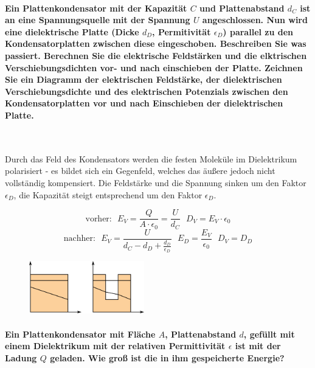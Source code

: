 \documentclass[a4paper, 11pt, parskip=half]{scrartcl}
\begin{document}
\paragraph{Ein Plattenkondensator mit der Kapazität $C$ und Plattenabstand $d_C$ ist an eine
Spannungsquelle mit der Spannung $U$ angeschlossen. Nun wird eine dielektrische Platte (Dicke $d_D$,
Permitivität $\epsilon_D$) parallel zu den Kondensatorplatten zwischen diese eingeschoben.
Beschreiben Sie was passiert. Berechnen Sie die elektrische Feldstärken und die elktrischen
Verschiebungsdichten vor- und nach einschieben der Platte. Zeichnen Sie ein Diagramm der
elektrischen Feldstärke, der dielektrischen Verschiebungsdichte und des elektrischen Potenzials
zwischen den Kondensatorplatten vor und nach Einschieben der dielektrischen Platte.} ~

Durch das Feld des Kondensators werden die festen Moleküle im Dielektrikum polarisiert - es bildet
sich ein Gegenfeld, welches das äußere jedoch nicht vollständig kompensiert. Die Feldstärke und die
Spannung sinken um den Faktor $\epsilon_D$, die Kapazität steigt entsprechend um den Faktor
$\epsilon_D$.

\begin{equation}
    \text{vorher:} ~~~
    E_V = \frac{Q}{A \cdot \epsilon_0} = \frac{U}{d_C} ~~~
    D_V = E_V \cdot \epsilon_0
\end{equation}
\begin{equation}
    \text{nachher:} ~~~
    E_V = \frac{U}{d_C - d_D + \frac{d_D}{\epsilon_D}} ~~~
    E_D = \frac{E_V}{\epsilon_0} ~~~
    D_V = D_D
\end{equation}

\begin{figure}[H]
    \centering
    \includegraphics[width=5cm]{image/2/4}
\end{figure}

\paragraph{Ein Plattenkondensator mit Fläche $A$, Plattenabstand $d$, gefüllt mit einem Dielektrikum
mit der relativen Permittivität $\epsilon$ ist mit der Ladung $Q$ geladen. Wie groß ist die in ihm
gespeicherte Energie?}
\end{document}
